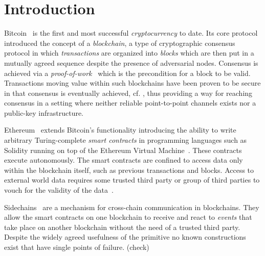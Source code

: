 \section{Introduction}

Bitcoin~\cite{bitcoin} is the first and most successful \emph{cryptocurrency}
to date. Its core protocol introduced the concept of a  \emph{blockchain}, a type of cryptographic consensus protocol in which 
\emph{transactions} are organized into \emph{blocks} which are then put in
 a mutually agreed sequence despite the presence of adversarial nodes. Consensus is achieved via  a  
\emph{proof-of-work}~\cite{C:DwoNao92} which is the precondition for a block to
be valid.  Transactions
moving value within such blockchains have been proven to be secure in that
consensus is eventually achieved, cf.  \cite{EC:GarKiaLeo15,PSS17,C:GarKiaLeo17},
thus providing a way for reaching consensus in a setting   where 
neither reliable point-to-point channels exists nor a public-key infrastructure. 

Ethereum~\cite{buterin} extends Bitcoin's functionality introducing the ability
to write arbitrary  Turing-complete \emph{smart contracts} in programming
languages such as Solidity running on top of the Ethereum Virtual
Machine~\cite{wood}. These contracts execute autonomously. The smart contracts
are confined to access data only within the blockchain itself, such as previous
transactions and blocks. Access to external world data requires some trusted
third party or group of third parties to vouch for the validity of the
data~\cite{CCS:ZCCJS16}.

Sidechains~\cite{sidechains} are a mechanism for cross-chain communication in
blockchains. They allow the smart contracts on one blockchain to receive and
react to \textit{events} that take place on another blockchain without the need
of a trusted third party. Despite the widely agreed usefulness of the primitive no known constructions exist that have single points of failure. (check) 

